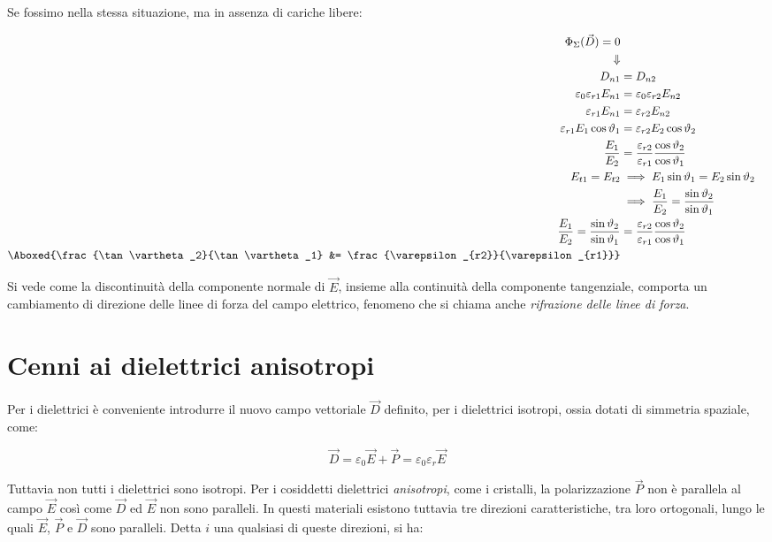 Se fossimo nella stessa situazione, ma in assenza di cariche libere:

\begin{align*}
	\Phi_{\Sigma}(\vec{D} ) = 0 \\
	\Downarrow \\
	D_{n1} &= D_{n2} \\
	\varepsilon_0 \varepsilon_{r1}E_{n1} &= \varepsilon_0 \varepsilon_{r2}E_{n2} \\
	\varepsilon_{r1}E_{n1} &= \varepsilon_{r2}E_{n2} \\
	\varepsilon_{r1}E_1\cos \vartheta_1  &= \varepsilon_{r2}E_2\cos \vartheta_2 \\
	\frac{E_1}{E_2} &= \frac{\varepsilon_{r2}}{\varepsilon_{r1}} \frac{\cos \vartheta_2}{\cos \vartheta_1} \\
	E_{t1} = E_{t2} & \implies E_1 \sin \vartheta_1 = E_2 \sin \vartheta_2 \\
	&\implies \frac{E_1}{E_2} = \frac{\sin \vartheta_2}{\sin \vartheta_1} \\
	\frac{E_1}{E_2} = \frac{\sin \vartheta_2}{\sin \vartheta_1} &= \frac{\varepsilon_{r2}}{\varepsilon_{r1}} \frac{\cos \vartheta_2}{\cos \vartheta_1} \\
	\Aboxed{\frac{\tan \vartheta_2}{\tan \vartheta_1} &= \frac{\varepsilon_{r2}}{\varepsilon_{r1}}}
\end{align*}

Si vede come la discontinuità della componente normale di $ \vec{E}  $, insieme alla continuità della componente tangenziale, comporta un cambiamento di direzione delle linee di forza del campo elettrico, fenomeno che si chiama anche \emph{rifrazione delle linee di forza}.

\section{Cenni ai dielettrici anisotropi}

Per i dielettrici è conveniente introdurre il nuovo campo vettoriale $\vec{D}$ definito, per i dielettrici isotropi, ossia dotati di simmetria spaziale, come:

\[
	\vec{D} =\varepsilon_0 \vec{E} + \vec{P} = \varepsilon_0 \varepsilon_r \vec{E}
\]

Tuttavia non tutti i dielettrici sono isotropi. Per i cosiddetti dielettrici \emph{anisotropi}, come i cristalli, la polarizzazione $\vec{P}$ non è parallela al campo $\vec{E}$ così come $\vec{D}$ ed $\vec{E}$ non sono paralleli. In questi materiali esistono tuttavia tre direzioni caratteristiche, tra loro ortogonali, lungo le quali $\vec{E}$, $\vec{P}$ e $\vec{D}$ sono paralleli. Detta $i$ una qualsiasi di queste direzioni, si ha:

